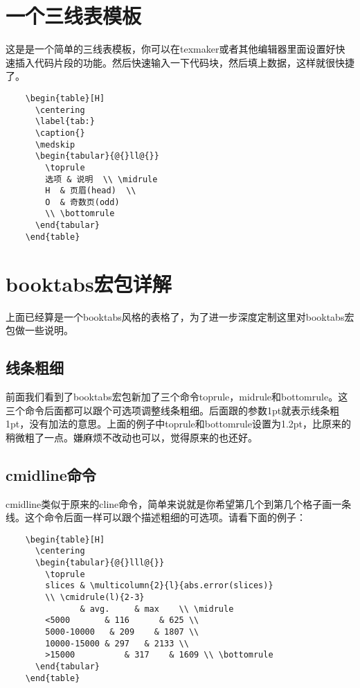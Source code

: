 \documentclass[11pt,oneside]{book}
\begin{document}
  \section{一个三线表模板}
  这是是一个简单的三线表模板，你可以在texmaker或者其他编辑器里面设置好快速插入代码片段的功能。然后快速输入一下代码块，然后填上数据，这样就很快捷了。
  \begin{Verbatim}
    \begin{table}[H]
      \centering
      \label{tab:}
      \caption{}
      \medskip
      \begin{tabular}{@{}ll@{}}
        \toprule
        选项 & 说明  \\ \midrule
        H  & 页眉(head)  \\
        O  & 奇数页(odd)
        \\ \bottomrule
      \end{tabular}
    \end{table}
  \end{Verbatim}


  \section{booktabs宏包详解}
  上面已经算是一个booktabs风格的表格了，为了进一步深度定制这里对booktabs宏包做一些说明。

  \subsection{线条粗细}
  前面我们看到了booktabs宏包新加了三个命令toprule，midrule和bottomrule。这三个命令后面都可以跟个可选项调整线条粗细。后面跟的参数1pt就表示线条粗1pt，没有加法的意思。上面的例子中toprule和bottomrule设置为1.2pt，比原来的稍微粗了一点。嫌麻烦不改动也可以，觉得原来的也还好。

  \subsection{cmidline命令}
  cmidline类似于原来的cline命令，简单来说就是你希望第几个到第几个格子画一条线。这个命令后面一样可以跟个描述粗细的可选项。请看下面的例子：

  \begin{Verbatim}
    \begin{table}[H]
      \centering
      \begin{tabular}{@{}lll@{}}
        \toprule
        slices & \multicolumn{2}{l}{abs.error(slices)}
        \\ \cmidrule(l){2-3}
               & avg.     & max    \\ \midrule
        <5000       & 116      & 625 \\
        5000-10000   & 209    & 1807 \\
        10000-15000 & 297   & 2133 \\
        >15000          & 317    & 1609 \\ \bottomrule
      \end{tabular}
    \end{table}
  \end{Verbatim}
\end{document}
